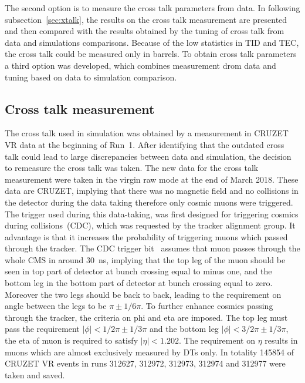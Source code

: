
The second option is to measure the cross talk parameters from data. In following subsection~\ref{sec:xtalk}, the results on the cross talk measurement are presented and then compared with the results obtained by the tuning of cross talk from data and simulations comparisons. Because of the low statistics in TID and TEC, the cross talk could be measured only in barrels. To obtain cross talk parameters a third option was developed, which combines measurement drom data and tuning based on data to simulation comparison.

\subsection{Cross talk  measurement~\label{sec:xtalk}}

The cross talk used in simulation was obtained by a measurement in CRUZET VR data at the beginning of Run~1. After identifying that the outdated cross talk could lead to large discrepancies between data and simulation, the decision  to remeasure the cross talk was taken. The new data for the cross talk measurement were taken in the virgin raw mode at the end of March 2018. These data are CRUZET, implying that there was no magnetic field and no collisions in the detector during the data taking therefore only cosmic muons were triggered. The trigger used during this data-taking, was first designed for triggering cosmics during collisions~(CDC), which was requested by the tracker alignment group. It advantage is that it increases the probability of triggering muons which passed through the tracker. The CDC trigger bit~\cite{website:trigger} assumes that muon passes through the whole CMS in around 30~ns, implying that the top leg of the muon should be seen in top part of detector at bunch crossing equal to minus one, and the bottom leg in the bottom part of detector at bunch crossing equal to zero. Moreover the two legs should be back to back, leading to the requirement on angle between the legs to be $\pi \pm 1/6\pi$. To further enhance cosmics passing through the tracker, the criteria on phi and eta are imposed. The top leg must pass the requirement $|\phi|<1/2\pi \pm 1/3\pi$ and the bottom leg $|\phi|<3/2\pi \pm 1/3\pi$, the eta of muon is required to satisfy $|\eta|<1.202$. The requirement on $\eta$ results in muons which are almost exclusively measured by DTs only. In totality 145854 of CRUZET VR events in runs 312627, 312972, 312973, 312974 and 312977 were taken and saved.

